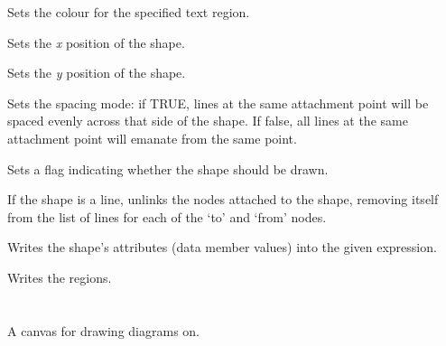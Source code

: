 

Sets the colour for the specified text region.



Sets the {\it x} position of the shape.



Sets the {\it y} position of the shape.



Sets the spacing mode: if TRUE, lines at the same attachment point will be
spaced evenly across that side of the shape. If false, all lines at the
same attachment point will emanate from the same point.



Sets a flag indicating whether the shape should be drawn.



If the shape is a line, unlinks the nodes attached to the shape, removing itself from the list of
lines for each of the `to' and `from' nodes.



Writes the shape's attributes (data member values) into the given expression.



Writes the regions.

\section{}\label{wxshapecanvas}

A canvas for drawing diagrams on.

